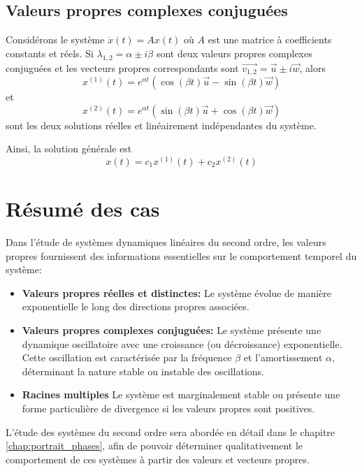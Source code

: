        \subsection{Valeurs propres complexes conjuguées}
            Considérons le système $\dot{x}(t)=Ax(t)$ où $A$ est une matrice à coefficients constants et réels. Si $\lambda_{1,2}=\alpha \pm i \beta$ sont deux valeurs propres complexes conjuguées et les vecteurs propres correspondants sont $\overrightarrow{v_{1,2}}=\overrightarrow{u} \pm i \overrightarrow{w}$, alors
            \begin{equation}
                x^{(1)}(t)=e^{\alpha t} (\cos(\beta t) \overrightarrow{u} - \sin(\beta t) \overrightarrow{w})
            \end{equation}
            et
            \begin{equation}
                x^{(2)}(t)=e^{\alpha t} (\sin(\beta t) \overrightarrow{u} + \cos(\beta t) \overrightarrow{w})
            \end{equation}
            sont les deux solutions réelles et linéairement indépendantes du système.
            
            Ainsi, la solution générale est
            \begin{equation}
                x(t)=c_1 x^{(1)}(t) + c_2 x^{(2)}(t)
            \end{equation}

    \section{Résumé des cas}
        Dans l'étude de systèmes dynamiques linéaires du second ordre, les valeurs propres fournissent des informations essentielles sur le comportement temporel du système:
        \begin{itemize}
            \item \textbf{Valeurs propres réelles et distinctes:} Le système évolue de manière exponentielle le long des directions propres associées.
            \item \textbf{Valeurs propres complexes conjuguées:} Le système présente une dynamique oscillatoire avec une croissance (ou décroissance) exponentielle. Cette oscillation est caractérisée par la fréquence $\beta$ et l'amortissement $\alpha$, déterminant la nature stable ou instable des oscillations.
            \item \textbf{Racines multiples} Le système est marginalement stable ou présente une forme particulière de divergence si les valeurs propres sont positives.
        \end{itemize}
        L'étude des systèmes du second ordre sera abordée en détail dans le chapitre \ref{chap:portrait_phases}, afin de pouvoir déterminer qualitativement le comportement de ces systèmes à partir des valeurs et vecteurs propres.

